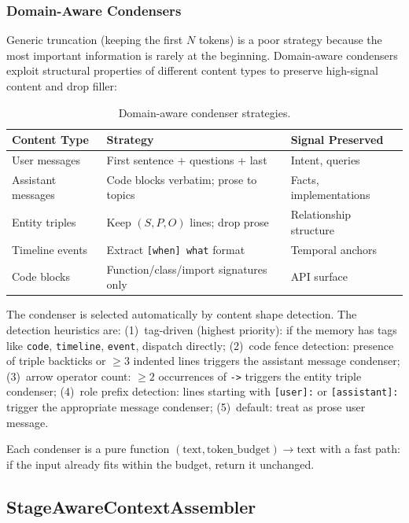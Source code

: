 \documentclass[11pt]{article}
\begin{document}
\subsubsection{Domain-Aware Condensers}

Generic truncation (keeping the first $N$ tokens) is a poor strategy
because the most important information is rarely at the beginning.
Domain-aware condensers exploit structural properties of different
content types to preserve high-signal content and drop filler:

\begin{table}[h]
\centering
\caption{Domain-aware condenser strategies.}
\label{tab:condensers}
\small
\begin{tabular}{lll}
\toprule
Content Type & Strategy & Signal Preserved \\
\midrule
User messages & First sentence + questions + last & Intent, queries \\
Assistant messages & Code blocks verbatim; prose to topics & Facts, implementations \\
Entity triples & Keep $(S, P, O)$ lines; drop prose & Relationship structure \\
Timeline events & Extract \texttt{[when] what} format & Temporal anchors \\
Code blocks & Function/class/import signatures only & API surface \\
\bottomrule
\end{tabular}
\end{table}

The condenser is selected automatically by content shape detection.
The detection heuristics are: (1)~tag-driven (highest priority): if
the memory has tags like \texttt{code}, \texttt{timeline},
\texttt{event}, dispatch directly; (2)~code fence detection: presence
of triple backticks or $\geq 3$ indented lines triggers the assistant
message condenser; (3)~arrow operator count: $\geq 2$ occurrences of
\texttt{->} triggers the entity triple condenser; (4)~role prefix
detection: lines starting with \texttt{[user]:} or
\texttt{[assistant]:} trigger the appropriate message condenser;
(5)~default: treat as prose user message.

Each condenser is a pure function
$(\text{text}, \text{token\_budget}) \to \text{text}$ with a fast
path: if the input already fits within the budget, return it unchanged.

\subsection{StageAwareContextAssembler}
\label{sec:assembler}
\end{document}
